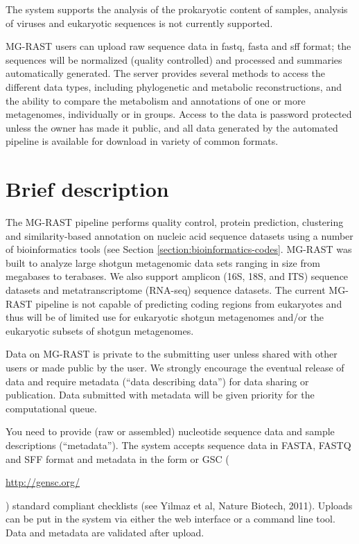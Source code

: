 \documentclass[12pt,fullpage]{report}
\begin{document}
The system supports the analysis of the prokaryotic content of samples, analysis of viruses and eukaryotic sequences is not currently supported.

MG-RAST users can upload raw sequence data in fastq, fasta and sff format; the sequences will be normalized (quality controlled) and processed and summaries automatically generated. The server provides several methods to access the different data types, including phylogenetic and metabolic reconstructions, and the ability to compare the metabolism and annotations of one or more metagenomes, individually or in groups. Access to the data is password protected unless the owner has made it public, and all data generated by the automated pipeline is available for download in variety of common formats.
\section{Brief description}
\label{section:brief-description}
The MG-RAST pipeline performs quality control, protein prediction, clustering and similarity-based annotation on nucleic acid sequence datasets using a number of bioinformatics tools (see Section \ref{section:bioinformatics-codes}.  MG-RAST was built to analyze large shotgun metagenomic data sets ranging in size from megabases to terabases.  We also support amplicon (16S, 18S, and ITS) sequence datasets and metatranscriptome (RNA-seq) sequence datasets.   The current MG-RAST pipeline is not capable of predicting coding regions from eukaryotes and thus will be of limited use for eukaryotic shotgun metagenomes and/or the eukaryotic subsets of shotgun metagenomes.

Data on MG-RAST is private to the submitting user unless shared with other users or made public by the user. We strongly encourage the eventual release of data and require metadata (``data describing data'') for data sharing or publication. Data submitted with metadata will be given priority for the computational queue.

You need to provide (raw or assembled) nucleotide sequence data and sample descriptions (``metadata''). The system accepts sequence data in FASTA, FASTQ and SFF format and metadata in the form or GSC (\begin{small}\url{http://gensc.org/}\end{small}) standard compliant checklists (see Yilmaz et al, Nature Biotech, 2011).   Uploads can be put in the system via either the web interface or a command line tool.   Data and metadata are validated after upload.
\end{document}
